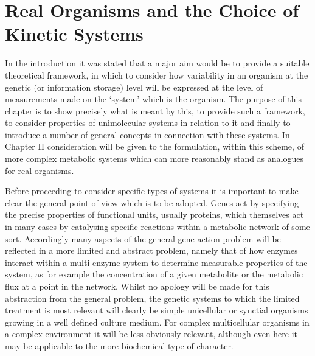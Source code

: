 \renewcommand*{\thesection}{\arabic{section}.}

\chapter{Real Organisms and the Choice of Kinetic Systems}

In the introduction it was stated that a major aim would be to provide a suitable theoretical framework, in which to consider how variability in an organism at the genetic (or information storage) level will be expressed at the level of measurements made on the `system' which is the organism. The purpose of this chapter is to show precisely what is meant by this, to provide such a framework, to consider properties of unimolecular systems in relation to it and finally to introduce a number of general concepts in connection with these systems. In Chapter II consideration will be given to the formulation, within this scheme, of more complex metabolic systems which can more reasonably stand as analogues for real organisms.

Before proceeding to consider specific types of systems it is important to make clear the general point of view which is to be adopted. Genes act by specifying the precise properties of functional units, usually proteins, which themselves act in many cases by catalysing specific reactions within a metabolic network of some sort. Accordingly many aspects of the general gene-action problem will be reflected in a more limited and abstract problem, namely that of how enzymes interact within a multi-enzyme system to determine measurable properties of the system, as for example the concentration of a given metabolite or the metabolic flux at a point in the network. Whilst no apology will be made for this abstraction from the general problem, the genetic systems to which the limited treatment is most relevant will clearly be simple unicellular or synctial organisms growing in a well defined culture medium. For complex multicellular organisms in a complex environment it will be less obviously relevant, although even here it may be applicable to the more biochemical type of character.

